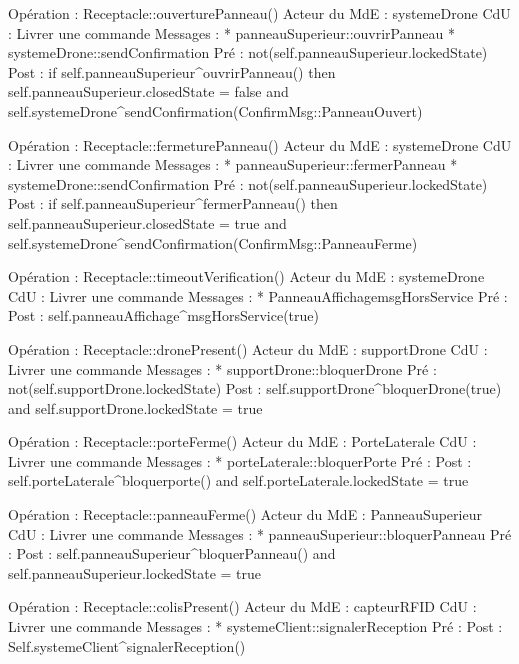 Opération : Receptacle::ouverturePanneau()
Acteur du MdE : systemeDrone
CdU : Livrer une commande
Messages : 
* panneauSuperieur::{ouvrirPanneau}
* systemeDrone::{sendConfirmation}
Pré : 
not(self.panneauSuperieur.lockedState)
Post :
        if self.panneauSuperieur^ouvrirPanneau() then
                self.panneauSuperieur.closedState = false
                and
                self.systemeDrone^sendConfirmation(ConfirmMsg::PanneauOuvert)
        
                


Opération : Receptacle::fermeturePanneau()
Acteur du MdE : systemeDrone
CdU : Livrer une commande
Messages : 
* panneauSuperieur::{fermerPanneau}
* systemeDrone::{sendConfirmation}
Pré :
 not(self.panneauSuperieur.lockedState)
Post :
        if self.panneauSuperieur^fermerPanneau() then
                self.panneauSuperieur.closedState = true
                and
                self.systemeDrone^sendConfirmation(ConfirmMsg::PanneauFerme)


Opération : Receptacle::timeoutVerification()
Acteur du MdE : systemeDrone
CdU : Livrer une commande
Messages : 
* PanneauAffichage{msgHorsService}
Pré :
Post :
        self.panneauAffichage^msgHorsService(true)




Opération : Receptacle::dronePresent()
Acteur du MdE : supportDrone
CdU : Livrer une commande
Messages : 
* supportDrone::{bloquerDrone}
Pré : not(self.supportDrone.lockedState)
Post :
        self.supportDrone^bloquerDrone(true)
        and
        self.supportDrone.lockedState = true






Opération : Receptacle::porteFerme()
Acteur du MdE : PorteLaterale
CdU : Livrer une commande
Messages : 
* porteLaterale::{bloquerPorte}
Pré :
Post :
        self.porteLaterale^bloquerporte()
        and
        self.porteLaterale.lockedState = true






Opération : Receptacle::panneauFerme()
Acteur du MdE : PanneauSuperieur
CdU : Livrer une commande
Messages : 
* panneauSuperieur::{bloquerPanneau}
Pré :
Post :
        self.panneauSuperieur^bloquerPanneau()
        and
        self.panneauSuperieur.lockedState = true






Opération : Receptacle::colisPresent()
Acteur du MdE : capteurRFID
CdU : Livrer une commande
Messages : 
* systemeClient::{signalerReception}
Pré :
Post :
        Self.systemeClient^signalerReception()